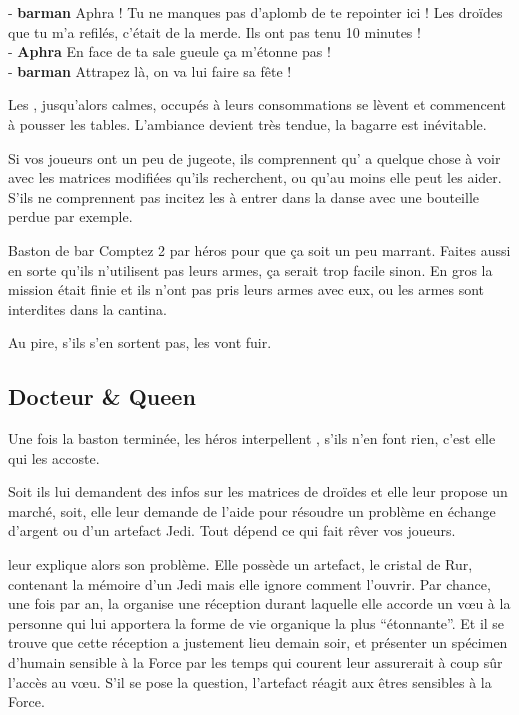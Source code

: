 \begin{quotebox}
- \textbf{barman} Aphra ! Tu ne manques pas d’aplomb de te repointer ici ! Les droïdes que tu m’a refilés, c’était de la merde. Ils ont pas tenu 10 minutes !\\
- \textbf{Aphra} En face de ta sale gueule ça m’étonne pas !\\
- \textbf{barman} Attrapez là, on va lui faire sa fête !
\end{quotebox}

Les , jusqu’alors calmes, occupés à leurs consommations se lèvent et commencent à pousser les tables. L’ambiance devient très tendue, la bagarre est inévitable.

Si vos joueurs ont un peu de jugeote, ils comprennent qu’ a quelque chose à voir avec les matrices modifiées qu’ils recherchent, ou qu’au moins elle peut les aider. S’ils ne comprennent pas incitez les à entrer dans la danse avec une bouteille perdue par exemple.

\begin{paperbox}{Baston de bar}
Comptez 2  par héros pour que ça soit un peu marrant. Faites aussi en sorte qu’ils n’utilisent pas leurs armes, ça serait trop facile sinon. En gros la mission était finie et ils n’ont pas pris leurs armes avec eux, ou les armes sont interdites dans la cantina.

Au pire, s’ils s’en sortent pas, les  vont fuir.
\end{paperbox}

\subsection{Docteur \& Queen}

Une fois la baston terminée, les héros interpellent , s’ils n’en font rien, c’est elle qui les accoste.

Soit ils lui demandent des infos sur les matrices de droïdes et elle leur propose un marché, soit, elle leur demande de l’aide pour résoudre un problème en échange d’argent ou d’un artefact Jedi. Tout dépend ce qui fait rêver vos joueurs.

 leur explique alors son problème. Elle possède un artefact, le cristal de Rur, contenant la mémoire d’un Jedi mais elle ignore comment l’ouvrir. Par chance, une fois par an, la  organise une réception durant laquelle elle accorde un vœu à la personne qui lui apportera la forme de vie organique la plus “étonnante”. Et il se trouve que cette réception a justement lieu demain soir, et présenter un spécimen d’humain sensible à la Force par les temps qui courent leur assurerait à coup sûr l’accès au vœu. S’il se pose la question, l’artefact réagit aux êtres sensibles à la Force.

